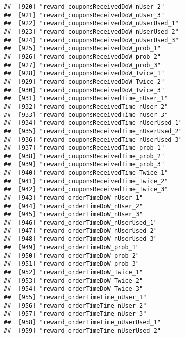\documentclass[10pt]{report}
\begin{document}
\begin{verbatim}
##  [920] "reward_couponsReceivedDoW_nUser_2"                    
##  [921] "reward_couponsReceivedDoW_nUser_3"                    
##  [922] "reward_couponsReceivedDoW_nUserUsed_1"                
##  [923] "reward_couponsReceivedDoW_nUserUsed_2"                
##  [924] "reward_couponsReceivedDoW_nUserUsed_3"                
##  [925] "reward_couponsReceivedDoW_prob_1"                     
##  [926] "reward_couponsReceivedDoW_prob_2"                     
##  [927] "reward_couponsReceivedDoW_prob_3"                     
##  [928] "reward_couponsReceivedDoW_Twice_1"                    
##  [929] "reward_couponsReceivedDoW_Twice_2"                    
##  [930] "reward_couponsReceivedDoW_Twice_3"                    
##  [931] "reward_couponsReceivedTime_nUser_1"                   
##  [932] "reward_couponsReceivedTime_nUser_2"                   
##  [933] "reward_couponsReceivedTime_nUser_3"                   
##  [934] "reward_couponsReceivedTime_nUserUsed_1"               
##  [935] "reward_couponsReceivedTime_nUserUsed_2"               
##  [936] "reward_couponsReceivedTime_nUserUsed_3"               
##  [937] "reward_couponsReceivedTime_prob_1"                    
##  [938] "reward_couponsReceivedTime_prob_2"                    
##  [939] "reward_couponsReceivedTime_prob_3"                    
##  [940] "reward_couponsReceivedTime_Twice_1"                   
##  [941] "reward_couponsReceivedTime_Twice_2"                   
##  [942] "reward_couponsReceivedTime_Twice_3"                   
##  [943] "reward_orderTimeDoW_nUser_1"                          
##  [944] "reward_orderTimeDoW_nUser_2"                          
##  [945] "reward_orderTimeDoW_nUser_3"                          
##  [946] "reward_orderTimeDoW_nUserUsed_1"                      
##  [947] "reward_orderTimeDoW_nUserUsed_2"                      
##  [948] "reward_orderTimeDoW_nUserUsed_3"                      
##  [949] "reward_orderTimeDoW_prob_1"                           
##  [950] "reward_orderTimeDoW_prob_2"                           
##  [951] "reward_orderTimeDoW_prob_3"                           
##  [952] "reward_orderTimeDoW_Twice_1"                          
##  [953] "reward_orderTimeDoW_Twice_2"                          
##  [954] "reward_orderTimeDoW_Twice_3"                          
##  [955] "reward_orderTimeTime_nUser_1"                         
##  [956] "reward_orderTimeTime_nUser_2"                         
##  [957] "reward_orderTimeTime_nUser_3"                         
##  [958] "reward_orderTimeTime_nUserUsed_1"                     
##  [959] "reward_orderTimeTime_nUserUsed_2"                     

\end{verbatim}
\end{document}
